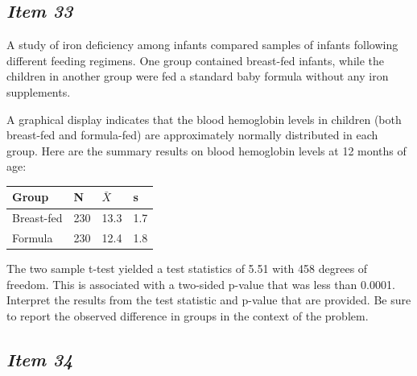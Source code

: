 \subsection{\textbf{\textit{Item 33}}}


A study of iron deficiency among infants compared samples of infants following different feeding regimens. One group contained breast-fed infants, while the children in another group were fed a standard baby formula without any iron supplements. 


A graphical display indicates that the 
blood hemoglobin levels in children (both breast-fed and formula-fed) are approximately normally distributed in each group. 
Here are the summary results on blood hemoglobin levels at 12 months of age:





\begin{table}[!ht]


\begin{center}


\begin{tabular}{llll}


\hline


Group & N & $\bar{X}$ & s\\


\hline


Breast-fed& 230 & 13.3 & 1.7\\


Formula & 230 & 12.4 & 1.8\\


\hline


\end{tabular}


\end{center}


\end{table}


The two sample t-test yielded a test statistics of 5.51 with 458 degrees of freedom. 
This is associated with a two-sided p-value that was less than 0.0001.
Interpret the results from the test statistic and p-value that are provided. 
Be sure to report the observed difference in groups in the context of the problem.



\subsection{\textbf{\textit{Item 34}}}


